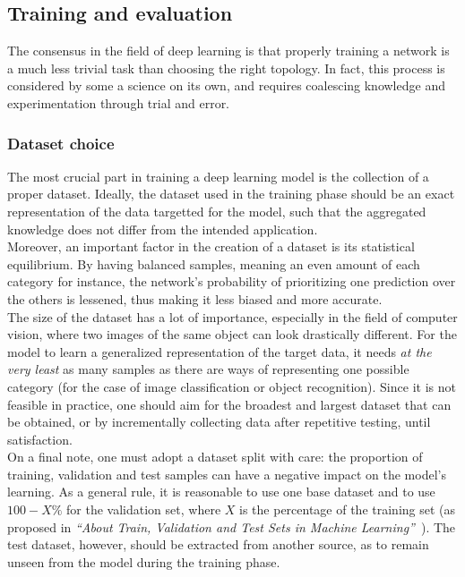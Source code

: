 \subsection{Training and evaluation}

The consensus in the field of deep learning is that properly training a network
is a much less trivial task than choosing the right topology. In fact, this
process is considered by some a science on its own, and requires coalescing
knowledge and experimentation through trial and error.

	\subsubsection{Dataset choice}

The most crucial part in training a deep learning model is the collection of a
proper dataset. Ideally, the dataset used in the training phase should be an
exact representation of the data targetted for the model, such that the
aggregated knowledge does not differ from the intended application.\\

Moreover, an important factor in the creation of a dataset is its statistical
equilibrium. By having balanced samples, meaning an even amount of each
category for instance, the network's probability of prioritizing one prediction
over the others is lessened, thus making it less biased and more accurate.\\

The size of the dataset has a lot of importance, especially in the
field of computer vision, where two images of the same object can look
drastically different. For the model to learn a generalized representation of
the target data, it needs \emph{at the very least} as many samples as
there are ways of representing one possible category (for the case of image
classification or object recognition). Since it is not feasible in practice,
one should aim for the broadest and largest dataset that can be obtained, or
by incrementally collecting data after repetitive testing, until
satisfaction.\\

On a final note, one must adopt a dataset split with care: the proportion of
training, validation and test samples can have a negative impact on the 
model's learning. As a general rule, it is reasonable to use one base dataset
and to use $100-X\%$ for the validation set, where $X$ is the percentage of the
training set (as proposed in \emph{``About Train, Validation and Test Sets in Machine
Learning''}~\cite{DatasetSplitting}). The test dataset, however, should be
extracted from another source, as to remain unseen from the model during the
training phase.

